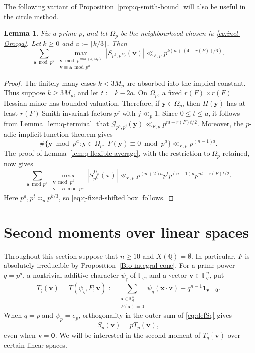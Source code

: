 \documentclass[a4paper,11pt, twoside,reqno]{amsart}
\theoremstyle{plain}
\newtheorem{lemma}[thm]{Lemma}
\theoremstyle{definition}
\theoremstyle{remark}
\newcommand{\F}{\mathbb{F}}
\newcommand{\bfa}{\bm{a}}
\newcommand{\bfv}{\bm{v}}
\newcommand{\bfx}{\bm{x}}
\newcommand{\bfy}{\bm{y}}
\newcommand{\QQ}{\mathbb{Q}}
\renewcommand{\leq}{\leqslant}
\renewcommand{\ge}{\geqslant}
\newcommand{\FF}{\mathbb{F}}
\numberwithin{equation}{section}
\begin{document}
The following variant of Proposition~\ref{prop:q-smith-bound} will also be useful
in the circle method.
\begin{lemma}
\label{lem:q-fixed-shifted box}
Fix a prime $p$, and let
\(\Omega_p\) be the neighbourhood chosen in \eqref{eq:inel-Omega}.
Let $k \ge 0$ and $a := \lceil k/3 \rceil$.
Then
\begin{equation}
\sum_{\bfa\bmod{p^a}}
\max_{\substack{\bfv\bmod{p^{\max(k,M_p)}} \\ \bfv\equiv \bfa\bmod{p^a}}}
|S_{p^k,p^{M_p}}(\bfv)|
\ll_{F,p}
p^{k(n + (4-r(F))/6)}.
\label{eq:q-fixed-shifted box}
\end{equation}
\end{lemma}

\begin{proof}
The finitely many cases $k<3M_p$ are absorbed into the implied constant.
Thus suppose $k\ge 3M_p$, and let $t := k-2a$.
On \(\Omega_p\), a fixed
\(r(F)\times r(F)\) Hessian minor has bounded valuation.
Therefore, if $\bfy\in \Omega_p$, then $H(\bfy)$ has at least $r(F)$ Smith invariant factors $p^j$ with $j\ll_p 1$.
Since \(0\leq t\leq a\), it follows from Lemma~\ref{lem:q-terminal}
that $\mathcal G_{p^a,p^t}(\bfy) \ll_{F,p} p^{nt-r(F) t/2}$.
Moreover, the \(p\)-adic implicit function theorem gives
\[
\#\{\bfy\bmod p^a:
\bfy\in\Omega_p,\ F(\bfy)\equiv0\bmod p^a\}
\ll_{F,p} p^{(n-1)a}.
\]
The proof of Lemma~\ref{lem:q-flexible-average}, with the restriction
to \(\Omega_p\) retained, now gives
\[
\sum_{\bfa\bmod{p^a}}
\max_{\substack{\bfv\bmod{p^k} \\ \bfv\equiv \bfa\bmod{p^a}}}
|S_{p^k}^{\Omega_p}(\bfv)|
\ll_{F,p} p^{(n+2)a} p^t
p^{(n-1)a}  p^{nt-r(F) t/2}.
\]
Here $p^a,p^t \asymp_p p^{k/3}$, so \eqref{eq:q-fixed-shifted box} follows.
\end{proof}





\section{Second moments over linear spaces}
\label{sec:n10-second-moments}

Throughout this section suppose that $n\ge10$ and $X(\QQ)=\emptyset$.
In particular, $F$ is absolutely irreducible
by Proposition~\ref{Bro-integral-cone}.
For a prime power $q=p^a$,
a nontrivial additive character $\psi_q$ of $\FF_q$,
and a vector $\bfv\in \FF_q^n$,
put
\begin{equation}
T_q(\bfv)=T(\psi_q,F;\bfv):=\sum_{\substack{\bfx\in\FF_q^n\\F(\bfx)=0}}
\psi_q(\bfx\cdot\bfv)
-q^{n-1}\bm1_{\bfv=\bm0}.
\label{n10:T}
\end{equation}
When $q=p$ and $\psi_p=e_p$, orthogonality in the outer sum of \eqref{eq:defSq} gives
\begin{equation}\label{eq:pST}
S_p(\bfv)=pT_p(\bfv),    
\end{equation}
even when $\bfv=\bm0$.
We will be interested in the second moment of $T_q(\bfv)$ over certain linear spaces.
\end{document}
